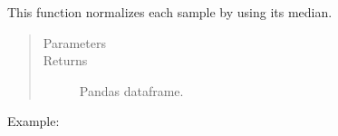 \documentclass[letterpaper,10pt,english]{sphinxmanual}
\begin{document}
\begin{fulllineitems}
\label{\detokenize{_autosummary/analytics_core.analytics:analytics_core.analytics.analytics.median_normalization}}
This function normalizes each sample by using its median.
\begin{quote}\begin{description}
\item[{Parameters}] \leavevmode
{} \textendash{} 

\item[{Returns}] \leavevmode
Pandas dataframe.

\end{description}\end{quote}

Example:

\begin{sphinxVerbatim}[commandchars=\\\{\}]
  
\end{sphinxVerbatim}

\end{fulllineitems}

\end{document}

